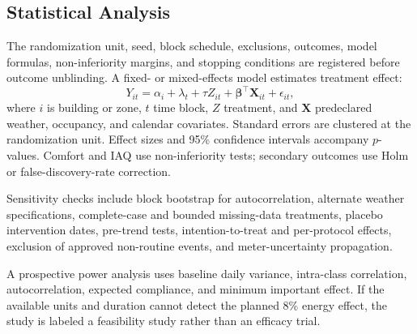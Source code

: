 \subsection{Statistical Analysis}

The randomization unit, seed, block schedule, exclusions, outcomes, model formulas, non-inferiority margins, and stopping conditions are registered before outcome unblinding. A fixed- or mixed-effects model estimates treatment effect:
\begin{equation}
	Y_{it}=\alpha_i+\lambda_t+\tau Z_{it}+\bm{\beta}^{\top}\bm{X}_{it}+\epsilon_{it},
	\label{eq:treatment}
\end{equation}
where $i$ is building or zone, $t$ time block, $Z$ treatment, and $\bm{X}$ predeclared weather, occupancy, and calendar covariates. Standard errors are clustered at the randomization unit. Effect sizes and 95\% confidence intervals accompany $p$-values. Comfort and IAQ use non-inferiority tests; secondary outcomes use Holm or false-discovery-rate correction.

Sensitivity checks include block bootstrap for autocorrelation, alternate weather specifications, complete-case and bounded missing-data treatments, placebo intervention dates, pre-trend tests, intention-to-treat and per-protocol effects, exclusion of approved non-routine events, and meter-uncertainty propagation.

A prospective power analysis uses baseline daily variance, intra-class correlation, autocorrelation, expected compliance, and minimum important effect. If the available units and duration cannot detect the planned 8\% energy effect, the study is labeled a feasibility study rather than an efficacy trial.
